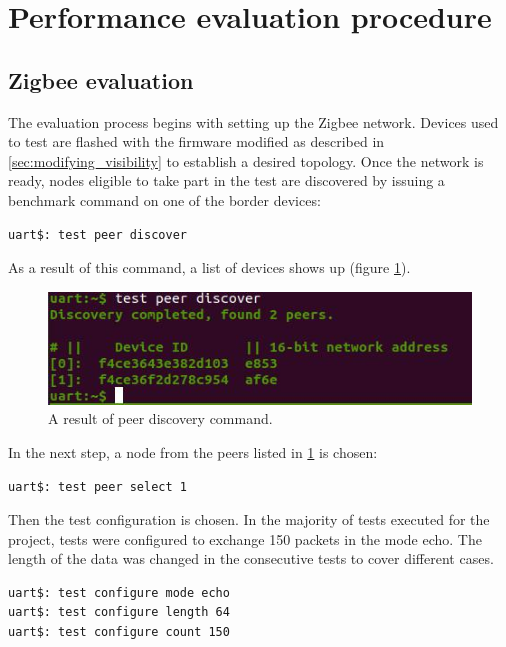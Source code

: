 \medskip
\section{Performance evaluation procedure}
\label{sec:performance-testing-scenario}

\subsection{Zigbee evaluation}

The evaluation process begins with setting up the Zigbee network. Devices
used to test are flashed with the firmware modified as described
in \ref{sec:modifying_visibility} to establish a desired topology. Once the 
network is ready, nodes eligible to take part in the test are discovered by
issuing a benchmark command on one of the border devices:
\begin{lstlisting}
uart$: test peer discover
\end{lstlisting}

\noindent As a result of this command, a list of devices shows up (figure \ref{fig:discovered_zigbee_devices}).
\begin{figure}[H]
    \centering
    \includegraphics{images/benchmark-devices.jpg}
    \caption{A result of peer discovery command.}
    \label{fig:discovered_zigbee_devices}
\end{figure}

In the next step, a node from the peers listed in \ref{fig:discovered_zigbee_devices} is 
chosen:
\begin{lstlisting}
uart$: test peer select 1
\end{lstlisting}

Then the test configuration is chosen. In the majority of tests executed for the project, tests 
were configured to exchange 150 packets in the mode echo. The length 
of the data was changed in the consecutive tests to cover different cases.
\begin{lstlisting}
uart$: test configure mode echo
uart$: test configure length 64
uart$: test configure count 150
\end{lstlisting}

